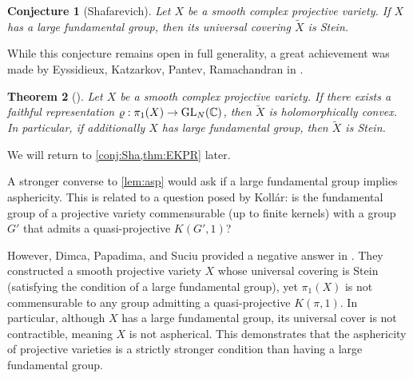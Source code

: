 \documentclass[english]{amsproc}
\theoremstyle{plain}
\newtheorem{thm}{Theorem}[section]
\newtheorem{conjecture}[thm]{Conjecture}
\theoremstyle{definition}
\theoremstyle{remark}
\theoremstyle{plain}
\numberwithin{equation}{thm} %
\newcommand{\bC}{\mathbb{C}}
\newcommand{\GL}{{\rm GL}}
\begin{document}
	\begin{conjecture}[Shafarevich]\label{conj:Sha}
		Let $X$ be a smooth complex projective variety. If $X$ has a large fundamental group, then its universal covering $\widetilde{X}$ is Stein. 
	\end{conjecture} 
	While this conjecture remains open in full generality, a great achievement was made   by Eyssidieux, Katzarkov, Pantev, Ramachandran  in \cite{EKPR12}. 
	\begin{thm}[\cite{EKPR12}]\label{thm:EKPR}
		Let $X$ be a smooth complex projective variety. If there exists a faithful representation $\varrho:\pi_1(X)\to \GL_{N}(\bC)$, then $\widetilde{X}$ is holomorphically convex. In particular, if additionally $X$ has large fundamental group, then $\widetilde{X}$ is Stein. 
	\end{thm}  We will return to \cref{conj:Sha,thm:EKPR} later.
	
	A stronger converse to \cref{lem:asp} would ask if a large fundamental group implies asphericity. This is related to a question posed by Koll\'ar: is the fundamental group of a projective variety commensurable (up to finite kernels) with a group $G'$ that admits a quasi-projective $K(G', 1)$?
	
	However, Dimca, Papadima, and Suciu provided a negative answer in \cite{DPS09}. They constructed a smooth projective variety $X$ whose universal covering is Stein (satisfying the condition of a large fundamental group), yet $\pi_1(X)$ is not commensurable to any group admitting a quasi-projective $K(\pi,1)$. In particular, although $X$ has a large fundamental group, its universal cover is not contractible, meaning $X$ is not aspherical. This demonstrates that the asphericity of projective varieties is a strictly stronger condition than having a large fundamental group.
	
	
	
\end{document}
